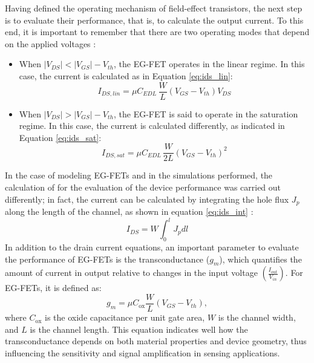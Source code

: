 Having defined the operating mechanism of field-effect transistors, the next step is to evaluate their performance, that is, to calculate the output current. To this end, it is important to remember that there are two operating modes that depend on the applied voltages \citep{shkodraElectrolytegated2021}:

\begin{itemize}
    \item When $\lvert V_{DS} \rvert < \lvert V_{GS} \rvert - V_{th}$, the EG-FET operates in the linear regime. In this case, the current is calculated as in Equation \eqref{eq:ids_lin}:
    \begin{equation}
        \label{eq:ids_lin}
        I_{DS,lin} = \mu C_{EDL}\,\frac{W}{L}\left(V_{GS}-V_{th}\right)V_{DS}
    \end{equation}
    \item When $\lvert V_{DS} \rvert > \lvert V_{GS} \rvert - V_{th}$, the EG-FET is said to operate in the saturation regime. In this case, the current is calculated differently, as indicated in Equation \eqref{eq:ids_sat}:
    \begin{equation}
        \label{eq:ids_sat}
        I_{DS,sat} = \mu C_{EDL}\,\frac{W}{2L}\left(V_{GS}-V_{th}\right)^2
    \end{equation}
\end{itemize}
%
In the case of modeling EG-FETs and in the simulations performed, the calculation of \ids{} for the evaluation of the device performance was carried out differently; in fact, the current can be calculated by integrating the hole flux $J_p$ along the length of the channel, as shown in equation \eqref{eq:ids_int} \citep{newmanElectrochemical2021, chennitInkjetPrinted2023}:
%
\begin{equation}
    \label{eq:ids_int}
    I_{DS} = W \int_{0}^{l}J_p dl
 \end{equation}
%
In addition to the drain current equations, an important parameter to evaluate the performance of EG-FETs is the transconductance ($g_m$), which quantifies the amount of current in output relative to changes in the input voltage $\left(\frac{I_{out}}{V_{in}} \right)$. For EG-FETs, it is defined as:
%
\begin{equation}
    \label{eq:transconductance}
    g_m = \mu C_{\text{ox}} \frac{W}{L} (V_{GS} - V_{th}),
\end{equation}
%
where $C_{\text{ox}}$ is the oxide capacitance per unit gate area, $W$ is the channel width, and $L$ is the channel length. This equation indicates well how the transconductance depends on both material properties and device geometry, thus influencing the sensitivity and signal amplification in sensing applications.